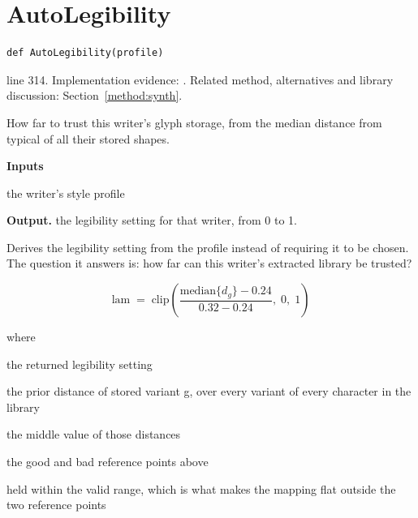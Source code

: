 \section{AutoLegibility}\label{fn:synthesise:AutoLegibility}
\begin{lstlisting}[style=sig]
def AutoLegibility(profile)
\end{lstlisting}
 line 314. Implementation evidence: \cite{code2026}. Related method, alternatives and library discussion: Section~\ref{method:synth}.


How far to trust this writer's glyph storage, from the median distance from typical of all their stored shapes.




\noindent\textbf{Inputs}
\begin{description}[leftmargin=2.2em,style=nextline,font=\normalfont\ttfamily]\setlength\itemsep{1pt}
  \item[{profile}] \normalfont the writer's style profile
\end{description}

\noindent\textbf{Output.} the legibility setting for that writer, from 0 to 1.


Derives the legibility setting from the profile instead of requiring it to be chosen. The question it answers is: how far can this writer's extracted library be trusted?


\begin{equation}
\mathrm{lam} \;=\; \mathrm{clip}\!\left( \frac{\mathrm{median}\{d_g\} - 0.24}{0.32 - 0.24},\; 0,\; 1\right)
\end{equation}

\noindent where
\begin{description}[leftmargin=2.4em,style=nextline,font=\normalfont\ttfamily]\setlength\itemsep{1pt}
  \item[{$\mathrm{lam}$}] \normalfont the returned legibility setting
  \item[{$d_g$}] \normalfont the prior distance of stored variant g, over every variant of every character in the library
  \item[{$\mathrm{median}$}] \normalfont the middle value of those distances
  \item[{$0.24,\;0.32$}] \normalfont the good and bad reference points above
  \item[{$\mathrm{clip}(\cdot,0,1)$}] \normalfont held within the valid range, which is what makes the mapping flat outside the two reference points
\end{description}

